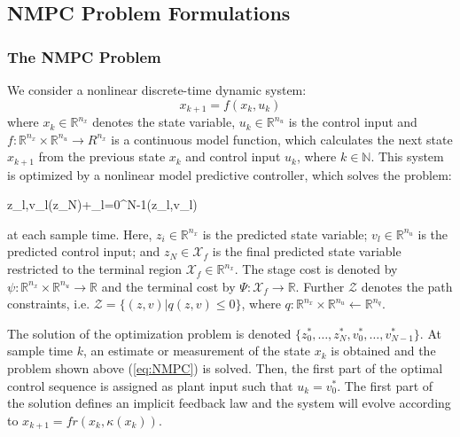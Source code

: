 \documentclass{article}
\theoremstyle{example}
\theoremstyle{definition}
\theoremstyle{assumption}
\theoremstyle{lemma}
\begin{document}
\subsection{NMPC Problem Formulations}
\subsubsection{The NMPC Problem}
We consider a nonlinear discrete-time dynamic system:
\begin{equation*}
	x_{k+1} = f(x_k,u_k)
\end{equation*}
where $x_k\in\mathbb{R}^{n_x}$ denotes the state variable, $u_k\in\mathbb{R}^{n_u}$ is the control input and $f:\mathbb{R}^{n_x}\times\mathbb{R}^{n_u}\rightarrow R^{n_x}$ is a continuous model function, which calculates the next state $x_{k+1}$ from the previous state $x_k$ and control input $u_k$, where $k\in\mathbb{N}$.
This system is optimized by a nonlinear model predictive controller, which solves the problem:
	\begin{mini!}
		{z_l,v_l}{\Psi(z_N)+\sum_{l=0}^{N-1}\psi(z_l,v_l)}{}{}
		\label{eq:NMPC}
	\end{mini!}
at each sample time.
Here, $z_i\in\mathbb{R}^{n_x}$ is the predicted state variable; $v_l\in\mathbb{R}^{n_u}$ is the predicted control input; and $z_N\in\mathcal{X}_f$ is the final predicted state variable restricted to the terminal region $\mathcal{X}_f\in\mathbb{R}^{n_x}$.
The stage cost is denoted by $\psi:\mathbb{R}^{n_x}\times\mathbb{R}^{n_u}\rightarrow\mathbb{R}$ and the terminal cost by $\Psi:\mathcal{X}_f\rightarrow\mathbb{R}$.
Further $\mathcal{Z}$ denotes the path constraints, i.e. $\mathcal{Z}=\{(z,v)|q(z,v)\leq0\}$, where $q:\mathbb{R}^{n_x}\times\mathbb{R}^{n_u}\leftarrow\mathbb{R}^{n_q}$.
\par
The solution of the optimization problem is denoted $\{z_0^*,\ldots,z_N^*,v_0^*,\ldots,v_{N-1}^*\}$.
At sample time $k$, an estimate or measurement of the state $x_k$ is obtained and the problem shown above (\ref{eq:NMPC}) is solved.
Then, the first part of the optimal control sequence is assigned as plant input such that $u_k=v_0^*$.
The first part of the solution defines an implicit feedback law and the system will evolve according to $x_{k+1}=fr(x_k,\kappa(x_k))$.
\end{document}
